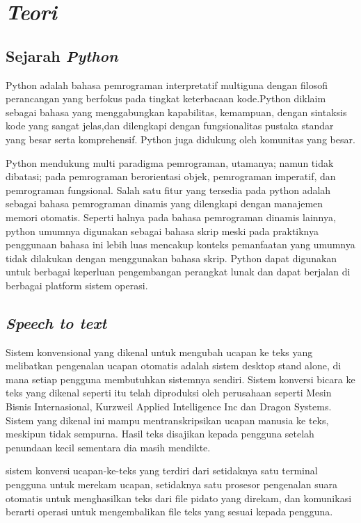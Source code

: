 \chapter{\textit{Teori}}
\section{Sejarah \textit{Python}}
\par Python adalah bahasa pemrograman interpretatif multiguna dengan filosofi perancangan yang berfokus pada tingkat keterbacaan kode.Python diklaim sebagai bahasa yang menggabungkan kapabilitas, kemampuan, dengan sintaksis kode yang sangat jelas,dan dilengkapi dengan fungsionalitas pustaka standar yang besar serta komprehensif. Python juga didukung oleh komunitas yang besar.

\par Python mendukung multi paradigma pemrograman, utamanya; namun tidak dibatasi; pada pemrograman berorientasi objek, pemrograman imperatif, dan pemrograman fungsional. Salah satu fitur yang tersedia pada python adalah sebagai bahasa pemrograman dinamis yang dilengkapi dengan manajemen memori otomatis. Seperti halnya pada bahasa pemrograman dinamis lainnya, python umumnya digunakan sebagai bahasa skrip meski pada praktiknya penggunaan bahasa ini lebih luas mencakup konteks pemanfaatan yang umumnya tidak dilakukan dengan menggunakan bahasa skrip. Python dapat digunakan untuk berbagai keperluan pengembangan perangkat lunak dan dapat berjalan di berbagai platform sistem operasi.
\section{\textit{Speech to text}}
\par Sistem konvensional yang dikenal untuk mengubah ucapan ke teks yang melibatkan pengenalan ucapan otomatis adalah sistem desktop stand alone, di mana setiap pengguna membutuhkan sistemnya sendiri. Sistem konversi bicara ke teks yang dikenal seperti itu telah diproduksi oleh perusahaan seperti Mesin Bisnis Internasional, Kurzweil Applied Intelligence Inc dan Dragon Systems. Sistem yang dikenal ini mampu mentranskripsikan ucapan manusia ke teks, meskipun tidak sempurna. Hasil teks disajikan kepada pengguna setelah penundaan kecil sementara dia masih mendikte.
\par sistem konversi ucapan-ke-teks yang terdiri dari setidaknya satu terminal pengguna untuk merekam ucapan, setidaknya satu prosesor pengenalan suara otomatis untuk menghasilkan teks dari file pidato yang direkam, dan komunikasi berarti operasi untuk mengembalikan file teks yang sesuai kepada pengguna. 


